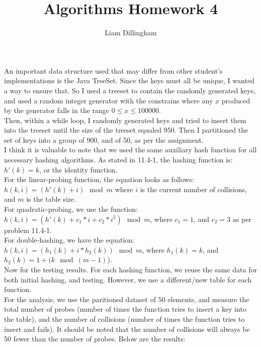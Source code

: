 \documentclass[20pt]{article} %
\title{Algorithms Homework 4}
\author{Liam Dillingham}
\begin{document}
\maketitle

An important data structure used that may differ from other student's implementations is the Java TreeSet.  Since the keys must all be unique, I wanted a way to ensure that.  So I used a treeset to contain the randomly generated keys, and used a random integer generator with the constrains where any $x$ produced by the generator falls in the range $0 \leq x \leq 100000$.\\

Then, within a while loop, I randomly generated keys and tried to insert them into the treeset until the size of the treeset equaled 950. Then I partitioned the set of keys into a group of 900, and of 50, as per the assignment. \\

I think it is valuable to note that we used the same auxiliary hash function for all necessary hashing algorithms. As stated in 11.4-1, the hashing function is: $h'(k) = k$, or the identity function. \\

For the linear-probing function, the equation looks as follows: $h(k, i) = (h'(k) + i ) \mod m$ where $i$ is the current number of collisions, and $m$ is the table size. \\ 

For quadratic-probing, we use the function: $h(k, i) = (h'(k) + c_1 * i + c_2 * i^{2}) \mod m$, where $c_1 = 1$, and $c_2 = 3$ as per problem 11.4-1. \\ 

For double-hashing, we have the equation: $h(k, i) = (h_1 (k) + i * h_2 (k)) \mod m$, where $h_1 (k) = k$, and $h_2 (k) = 1 + (k \mod (m - 1)$). \\

Now for the testing results.  For each hashing function, we reuse the same data for both initial hashing, and testing.  However, we use a different/new table for each function.  \\

For the analysis, we use the paritioned dataset of 50 elements, and measure the total number of probes (number of times the function tries to insert a key into the table), and the number of collisions (number of times the function tries to insert and fails).  It should be noted that the number of collisions will always be 50 fewer than the number of probes.  Below are the results:  \\
\end{document}
